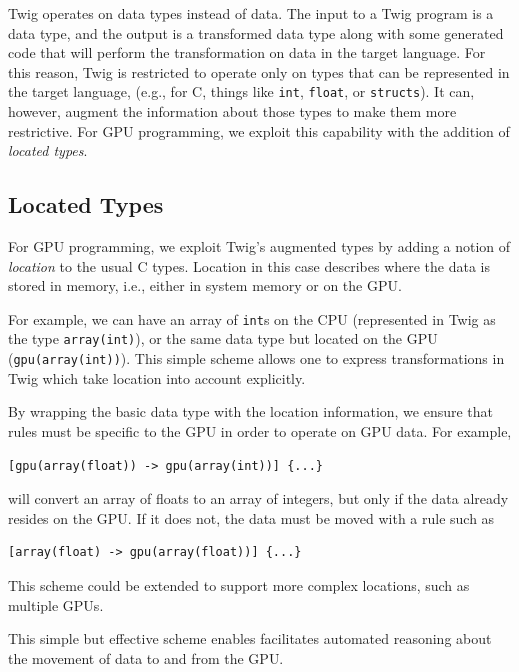 Twig operates on data types instead of data. The input to a Twig program is a
data type, and the output is a transformed data type along with some generated
code that will perform the transformation on data in the target language. For
this reason, Twig is restricted to operate only on types that can be represented
in the target language, (e.g., for C, things like \texttt{int}, \texttt{float},
or \texttt{structs}). It can, however, augment the information about those types
to make them more restrictive. For GPU programming, we exploit this capability
with the addition of \emph{located types}.

\subsection{Located Types}


For GPU programming, we exploit Twig's augmented types by adding a notion of
\emph{location} to the usual C types. Location in this case describes where the
data is stored in memory, i.e., either in system memory or on the GPU. 

For example, we can have an array of \texttt{int}s on the CPU (represented in
Twig as the type \texttt{array(int)}), or the same data type but located on the
GPU (\texttt{gpu(array(int))}). This simple scheme allows one to express
transformations in Twig which take location into account explicitly.

By wrapping the basic data type with the location information, we ensure that
rules must be specific to the GPU in order to operate on GPU data. For example,

\begin{verbatim}
[gpu(array(float)) -> gpu(array(int))] {...}
\end{verbatim}

will convert an array of floats to an array of integers, but only if the data
already resides on the GPU. If it does not, the data must be moved with a rule
such as

\begin{verbatim}
[array(float) -> gpu(array(float))] {...}
\end{verbatim}

This scheme could be extended to support more complex locations, such as
multiple GPUs.

This simple but effective scheme enables facilitates automated reasoning about
the movement of data to and from the GPU.
